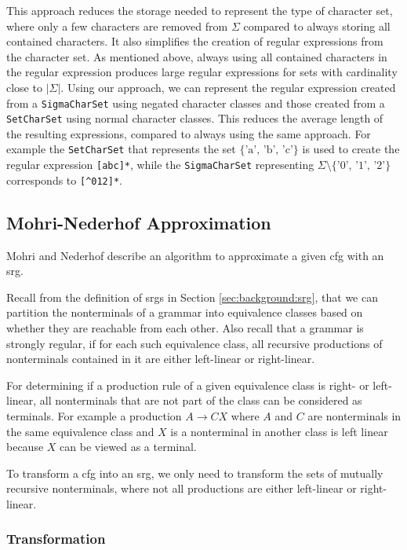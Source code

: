 This approach reduces the storage needed to represent the type of character set, where only a few characters are removed from $\Sigma$ compared to always storing all contained characters. It also simplifies the creation of regular expressions from the character set. As mentioned above, always using all contained characters in the regular expression produces large regular expressions for sets with cardinality close to $|\Sigma|$. Using our approach, we can represent the regular expression created from a \lstinline|SigmaCharSet| using negated character classes and those created from a \lstinline|SetCharSet| using normal character classes. This reduces the average length of the resulting expressions, compared to always using the same approach.
For example the \lstinline|SetCharSet| that represents the set $\{\text{'a', 'b', 'c'}\}$ is used to create the regular expression \lstinline|[abc]*|, while the \lstinline|SigmaCharSet| representing $\Sigma \setminus \{\text{'0', '1', '2'}\}$ corresponds to \lstinline|[^012]*|.

		
\subsection{Mohri-Nederhof Approximation}\label{sec:mohriNederhofApprox}


Mohri and Nederhof \cite{mohri_nederhof} describe an algorithm to approximate a given \ac{cfg} with an \ac{srg}.

Recall from the definition of \acp{srg} in Section \ref{sec:background:srg}, that we can partition the nonterminals of a grammar into equivalence classes based on whether they are reachable from each other. Also recall that a grammar is strongly regular, if for each such equivalence class, all recursive productions of nonterminals contained in it are either left-linear or right-linear.

For determining if a production rule of a given equivalence class is right- or left-linear, all nonterminals that are not part of the class can be considered as terminals. For example a production $A \rightarrow CX$ where $A$ and $C$ are nonterminals in the same equivalence class and $X$ is a nonterminal in another class is left linear because $X$ can be viewed as a terminal.

To transform a \ac{cfg} into an \ac{srg}, we only need to transform the sets of mutually recursive nonterminals, where not all productions are either left-linear or right-linear.

\subsubsection{Transformation}

